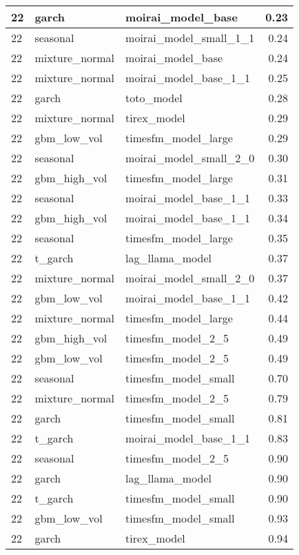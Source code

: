 {\begin{tabular}{lllr}
\midrule
22 & garch & moirai\_model\_base & 0.23 \\
\midrule
22 & seasonal & moirai\_model\_small\_1\_1 & 0.24 \\
\midrule
22 & mixture\_normal & moirai\_model\_base & 0.24 \\
\midrule
22 & mixture\_normal & moirai\_model\_base\_1\_1 & 0.25 \\
\midrule
22 & garch & toto\_model & 0.28 \\
\midrule
22 & mixture\_normal & tirex\_model & 0.29 \\
\midrule
22 & gbm\_low\_vol & timesfm\_model\_large & 0.29 \\
\midrule
22 & seasonal & moirai\_model\_small\_2\_0 & 0.30 \\
\midrule
22 & gbm\_high\_vol & timesfm\_model\_large & 0.31 \\
\midrule
22 & seasonal & moirai\_model\_base\_1\_1 & 0.33 \\
\midrule
22 & gbm\_high\_vol & moirai\_model\_base\_1\_1 & 0.34 \\
\midrule
22 & seasonal & timesfm\_model\_large & 0.35 \\
\midrule
22 & t\_garch & lag\_llama\_model & 0.37 \\
\midrule
22 & mixture\_normal & moirai\_model\_small\_2\_0 & 0.37 \\
\midrule
22 & gbm\_low\_vol & moirai\_model\_base\_1\_1 & 0.42 \\
\midrule
22 & mixture\_normal & timesfm\_model\_large & 0.44 \\
\midrule
22 & gbm\_high\_vol & timesfm\_model\_2\_5 & 0.49 \\
\midrule
22 & gbm\_low\_vol & timesfm\_model\_2\_5 & 0.49 \\
\midrule
22 & seasonal & timesfm\_model\_small & 0.70 \\
\midrule
22 & mixture\_normal & timesfm\_model\_2\_5 & 0.79 \\
\midrule
22 & garch & timesfm\_model\_small & 0.81 \\
\midrule
22 & t\_garch & moirai\_model\_base\_1\_1 & 0.83 \\
\midrule
22 & seasonal & timesfm\_model\_2\_5 & 0.90 \\
\midrule
22 & garch & lag\_llama\_model & 0.90 \\
\midrule
22 & t\_garch & timesfm\_model\_small & 0.90 \\
\midrule
22 & gbm\_low\_vol & timesfm\_model\_small & 0.93 \\
\midrule
22 & garch & tirex\_model & 0.94 \\

\end{tabular}}
